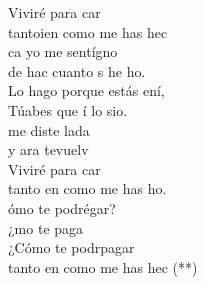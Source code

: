 \documentclass[12pt]{article}
\begin{document}
\begin{multicols*}{2}
\begin{cancion}
\begin{chorus}
	Viviré para car \\
	tantoien como me has hec \\
	ca yo me sentígno \\
	de hac cuanto s he ho.\\
	Lo hago porque estás ení, \\
	Túabes que í lo sio.\\
	 me diste lada \\
	y ara tevuelv\\
	Viviré para car\\
	tanto en como me has ho.\\
	ómo te podrégar?\\
	¿mo te paga  \\
	¿Cómo te podrpagar \\
	tanto en como me has hec (**)\\
	\end{chorus}%
	\jump\\
\end{cancion}%


\end{multicols*}
\end{document}
